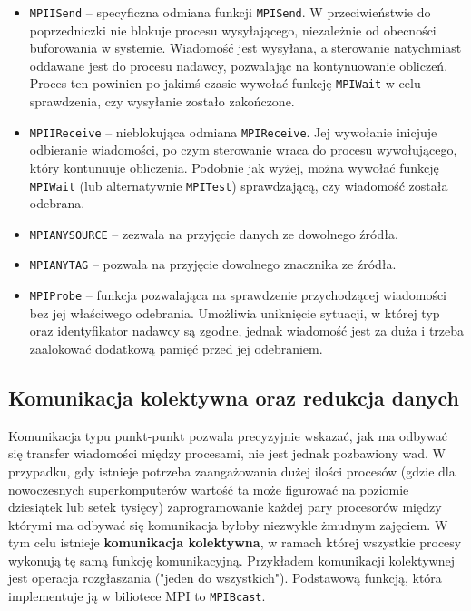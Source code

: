 \begin{itemize}
	\item \texttt{MPI\textunderscore ISend} -- specyficzna odmiana funkcji \texttt{MPI\textunderscore Send}. W przeciwieństwie do poprzedniczki nie blokuje procesu wysyłającego, niezależnie od obecności buforowania w systemie. Wiadomość jest wysyłana, a sterowanie natychmiast oddawane jest do procesu nadawcy, pozwalając na kontynuowanie obliczeń. Proces ten powinien po jakimś czasie wywołać funkcję \texttt{MPI\textunderscore Wait} w celu sprawdzenia, czy wysyłanie zostało zakończone.
	\item \texttt{MPI\textunderscore IReceive} -- nieblokująca odmiana
	\texttt{MPI\textunderscore Receive}. Jej wywołanie inicjuje odbieranie wiadomości, po czym sterowanie wraca do procesu wywołującego, który kontunuuje obliczenia. Podobnie jak wyżej, można wywołać funkcję \texttt{MPI\textunderscore Wait} (lub alternatywnie \texttt{MPI\textunderscore Test}) sprawdzającą, czy wiadomość została odebrana.
	\item \texttt{MPI\textunderscore ANY\textunderscore SOURCE} -- zezwala na przyjęcie danych ze dowolnego źródła.
	\item \texttt{MPI\textunderscore ANY\textunderscore TAG} -- pozwala na przyjęcie dowolnego znacznika ze źródła.
	\item \texttt{MPI\textunderscore Probe} -- funkcja pozwalająca na sprawdzenie przychodzącej wiadomości bez jej właściwego odebrania. Umożliwia uniknięcie sytuacji, w której typ oraz identyfikator nadawcy są zgodne, jednak wiadomość jest za duża i trzeba zaalokować dodatkową pamięć przed jej odebraniem.
	
\end{itemize}

\subsection{Komunikacja kolektywna oraz redukcja danych}

Komunikacja typu punkt-punkt pozwala precyzyjnie wskazać, jak ma odbywać się transfer wiadomości między procesami, nie jest jednak pozbawiony wad. W przypadku, gdy istnieje potrzeba zaangażowania dużej ilości procesów (gdzie dla nowoczesnych superkomputerów wartość ta może figurować na poziomie dziesiątek lub setek tysięcy) zaprogramowanie każdej pary procesorów między którymi ma odbywać się komunikacja byłoby niezwykle żmudnym zajęciem. W tym celu istnieje \textbf{komunikacja kolektywna}, w ramach której wszystkie procesy wykonują tę samą funkcję komunikacyjną. Przykładem komunikacji kolektywnej jest operacja rozgłaszania ("jeden do wszystkich"). Podstawową funkcją, która implementuje ją w biliotece MPI to \texttt{MPI\textunderscore Bcast}.


